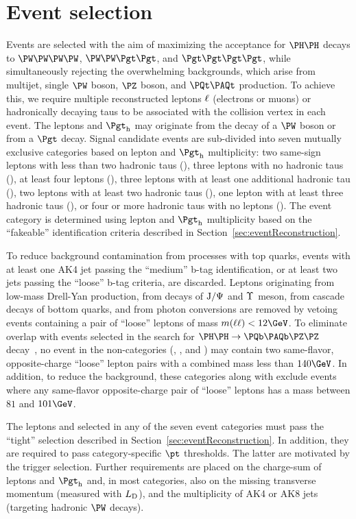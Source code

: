\section{Event selection}
\label{sec:eventSelection}

Events are selected with the aim of maximizing the acceptance for $\HH$ decays to $\WWWW$, $\WWtt$, and
$\tttt$, while simultaneously rejecting the overwhelming backgrounds, which arise from multijet, single $\PW$
boson, $\PZ$ boson, and $\ttbar$ production.  To achieve this, we require multiple
reconstructed leptons $\ell$ (electrons or muons) or hadronically decaying taus
\tauh to be associated with the collision vertex in each event.  The leptons and $\tauh$ may originate
from the decay of a $\PW$ boson or from a $\Pgt$ decay.  Signal candidate events
are sub-divided into seven mutually exclusive categories based on lepton and $\tauh$
multiplicity: two same-sign leptons with less than two hadronic taus (\llss),
three leptons with no hadronic taus (\lllnot), at least four leptons (\llll),
three leptons with at least one additional hadronic tau (\lllt), two
leptons with at least two hadronic taus (\lltt), one lepton with at least
three hadronic taus (\lttt), or four or more hadronic taus with no leptons (\noltttt).
The event category is determined using lepton and $\tauh$ multiplicity based on the
``fakeable'' identification criteria described in Section~\ref{sec:eventReconstruction}.

To reduce background contamination from processes with top quarks, events with
at least one AK4 jet passing the ``medium'' b-tag identification, or at least two
jets passing the ``loose'' b-tag criteria, are discarded. 
Leptons originating from low-mass Drell-Yan production, from decays of $\textrm{J}/\Psi$ and $\Upsilon$ meson,
from cascade decays of bottom quarks, and from photon conversions
are removed by vetoing events containing a pair of ``loose'' leptons of mass $m(\leplep) < 12\GeV$.
To eliminate overlap with events selected in the search for $\HH \to \Pbottom\APbottom\PZ\PZ$ decay~\cite{HIG-20-004}, no event in the
non-\tauh categories (\llss, \lllnot, and \llll) may contain two same-flavor,
opposite-charge ``loose'' lepton pairs with a combined mass less than $140\GeV$.
In addition, to reduce the \Zll background, these categories along with
\lltt exclude events where any same-flavor opposite-charge pair of ``loose''
leptons has a mass between $81$ and $101\GeV$.

The leptons and \tauh selected in any of the seven event categories must pass the ``tight'' selection 
described in Section~\ref{sec:eventReconstruction}.
In addition, they are required to pass category-specific $\pt$ thresholds.
The latter are motivated by the trigger selection.
Further requirements are placed on the charge-sum of leptons and $\tauh$
and, in most categories, also on the missing transverse momentum (measured with $L_\mathrm{D}$),
and the multiplicity of AK4 or AK8 jets (targeting hadronic $\PW$ decays). 

